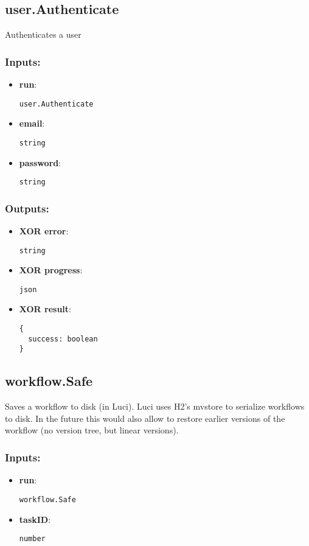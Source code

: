 \subsection{user.Authenticate}
\label{ch:builtinservices:user.Authenticate}
Authenticates a user
\subsubsection*{Inputs:}
\begin{itemize}
    \item \textbf{run}: 
\begin{lstlisting}
user.Authenticate
\end{lstlisting}
    \item \textbf{email}: 
\begin{lstlisting}
string
\end{lstlisting}
    \item \textbf{password}: 
\begin{lstlisting}
string
\end{lstlisting}
  \end{itemize}

\subsubsection*{Outputs:}
\begin{itemize}
    \item \textbf{XOR error}: 
\begin{lstlisting}
string
\end{lstlisting}
    \item \textbf{XOR progress}: 
\begin{lstlisting}
json
\end{lstlisting}
    \item \textbf{XOR result}: 
\begin{lstlisting}
{
  success: boolean
}
\end{lstlisting}
  \end{itemize}

\subsection{workflow.Safe}
\label{ch:builtinservices:workflow.Safe}
Saves
 a workflow to disk (in Luci). Luci uses H2's mvstore to serialize 
workflows to disk. In the future this would also allow to restore 
earlier versions of the workflow (no version tree, but linear versions).
\subsubsection*{Inputs:}
\begin{itemize}
    \item \textbf{run}: 
\begin{lstlisting}
workflow.Safe
\end{lstlisting}
    \item \textbf{taskID}: 
\begin{lstlisting}
number
\end{lstlisting}
  \end{itemize}


